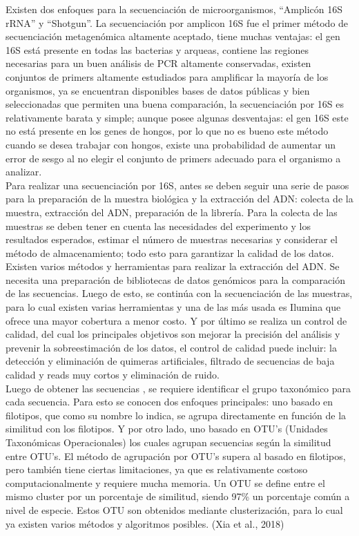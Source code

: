 Existen dos enfoques para la secuenciación de microorganismos, “Amplicón 16S rRNA” y “Shotgun”.  La secuenciación por amplicon  16S fue el primer método de secuenciación metagenómica altamente aceptado, tiene muchas ventajas: el gen 16S está presente en todas las bacterias y arqueas, contiene las regiones necesarias para un buen análisis de PCR altamente conservadas,  existen conjuntos de primers altamente estudiados para amplificar la mayoría de los organismos, ya se encuentran disponibles bases de datos públicas y bien seleccionadas que permiten una buena comparación, la secuenciación por 16S es relativamente barata y simple; aunque posee algunas desventajas: el gen 16S este no está presente en los genes de hongos, por lo que no es bueno este método cuando se desea trabajar con hongos, existe una probabilidad de aumentar un error de sesgo al no elegir el conjunto de primers adecuado para el organismo a analizar. \\

Para realizar una secuenciación por 16S, antes se deben seguir una serie de pasos para la preparación de la muestra biológica y la extracción del ADN: colecta de la muestra, extracción del ADN, preparación de la librería. Para la colecta de las muestras se deben tener en cuenta las necesidades del experimento y los resultados esperados, estimar el número de muestras necesarias y considerar el método de almacenamiento; todo esto para garantizar la calidad de los datos. Existen varios métodos y herramientas para realizar la extracción del ADN. Se necesita una preparación de bibliotecas de datos genómicos para la comparación de las secuencias. Luego de esto, se continúa con la secuenciación de las muestras, para lo cual existen varias herramientas y una de las más usada es Ilumina que ofrece una mayor cobertura a menor costo. Y por último se realiza un control de calidad, del cual los principales objetivos son mejorar la precisión del análisis y prevenir la sobreestimación de los datos, el control de calidad puede incluir: la detección y eliminación de quimeras artificiales, filtrado de secuencias de baja calidad y reads muy cortos y eliminación de ruido. \\

Luego de obtener las secuencias , se requiere identificar el grupo taxonómico para cada secuencia. Para esto se conocen dos enfoques principales: uno basado en filotipos, que como su nombre lo indica, se agrupa directamente en función de la similitud con los filotipos. Y por otro lado, uno basado en OTU’s (Unidades Taxonómicas Operacionales) los cuales agrupan secuencias según la similitud entre OTU’s. El método de agrupación por OTU’s supera al basado en filotipos, pero también tiene ciertas limitaciones, ya que es relativamente costoso computacionalmente y requiere mucha memoria. Un OTU se define entre el mismo cluster por un porcentaje de similitud, siendo 97\% un porcentaje común a nivel de especie. Estos OTU son obtenidos mediante clusterización, para lo cual ya existen varios métodos y algoritmos posibles. (Xia et al., 2018) \\

